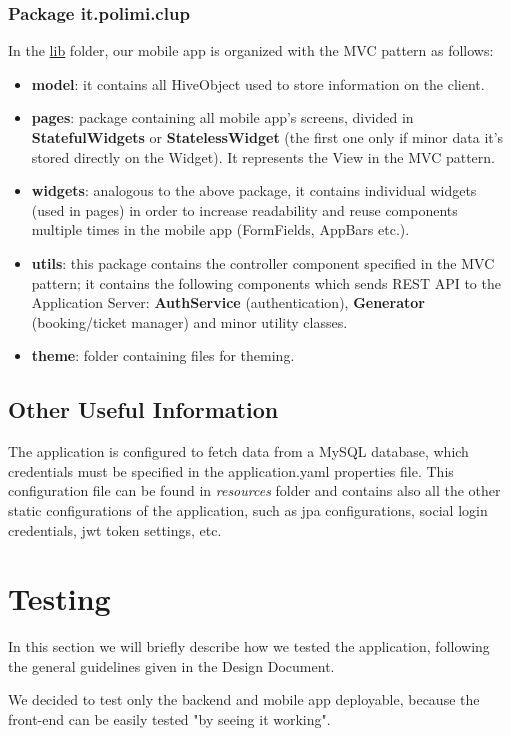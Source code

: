 \documentclass[table, 12pt]{article}
\begin{document}
 \subsubsection*{Package it.polimi.clup}
 In the \underline{lib} folder, our mobile app is organized with the MVC pattern as follows:
\begin{itemize}
    \item \textbf{model}: it contains all HiveObject used to store information on the client.
    \item \textbf{pages}: package containing all mobile app's screens, divided in \textbf{StatefulWidgets} or \textbf{StatelessWidget} (the first one only if minor data it's stored directly on the Widget). It represents the View in the MVC pattern.
    \item \textbf{widgets}: analogous to the above package, it contains individual widgets (used in pages) in order to increase readability and reuse components multiple times in the mobile app (FormFields, AppBars etc.).
    \item \textbf{utils}: this package contains the controller component specified in the MVC pattern; it contains the following components which sends REST API to the Application Server: \textbf{AuthService} (authentication), \textbf{Generator} (booking/ticket manager) and minor utility classes.
    \item \textbf{theme}: folder containing files for theming.
\end{itemize}
\subsection{Other Useful Information}
The application is configured to fetch data from a MySQL database, which credentials must be specified in the application.yaml properties file. This configuration file can be found in \textit{resources} folder and contains also all the other static configurations of the application, such as jpa configurations, social login credentials, jwt token settings, etc.
\newpage
\section{Testing}
\label{testing}
In this section we will briefly describe how we tested the application, following the general guidelines given in the Design Document.

We decided to test only the backend and mobile app deployable, because the front-end can be easily tested "by seeing it working".
\end{document}
